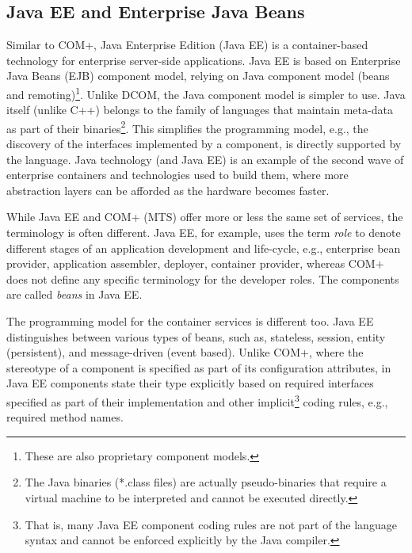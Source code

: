 \subsection{Java EE and Enterprise Java Beans}
\label{sec.c2.ejb}

Similar to COM+, Java Enterprise Edition (Java EE) \cite{j2ee14} is a container-based technology for enterprise server-side applications. Java EE is based on Enterprise Java Beans (EJB) \cite{ejb21} component model, relying on Java \cite{www.java} component model (beans and remoting)\footnote{These are also proprietary component models.}. Unlike DCOM, the Java component model is simpler to use. Java itself (unlike C++) belongs to the family of languages that maintain meta-data as part of their binaries\footnote{The Java binaries (*.class files) are actually pseudo-binaries that require a virtual machine to be interpreted and cannot be executed directly.}. This simplifies the programming model, e.g., the discovery of the interfaces implemented by a component, is directly supported by the language. Java technology (and Java EE) is an example of the second wave of enterprise containers and technologies used to build them, where more abstraction layers can be afforded as the hardware becomes faster.

While Java EE and COM+ (MTS) offer more or less the same set of services, the terminology is often different. Java EE, for example, uses the term \textit{role} to denote different stages of an application development and life-cycle, e.g., enterprise bean provider, application assembler, deployer, container provider, whereas COM+ does not define any specific terminology for the developer roles. The components are called \textit{beans} in Java EE.

The programming model for the container services is different too. Java EE distinguishes between various types of beans, such as, stateless, session, entity (persistent), and message-driven (event based). Unlike COM+, where the stereotype of a component is specified as part of its configuration attributes, in Java EE components state their type explicitly based on required interfaces specified as part of their implementation and other implicit\footnote{That is, many Java EE component coding rules are not part of the language syntax and cannot be enforced explicitly by the Java compiler.} coding rules, e.g., required method names.

